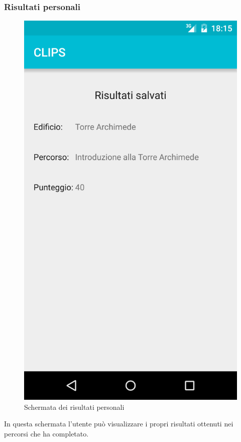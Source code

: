 \subsubsection{Risultati personali}

\begin{figure}[!h]
	\centering
	\includegraphics[scale=0.15]{screenshot/risultati_personali}
	\caption{Schermata dei risultati personali}
\end{figure}

In questa schermata l'utente può visualizzare i propri risultati ottenuti nei percorsi che ha completato.